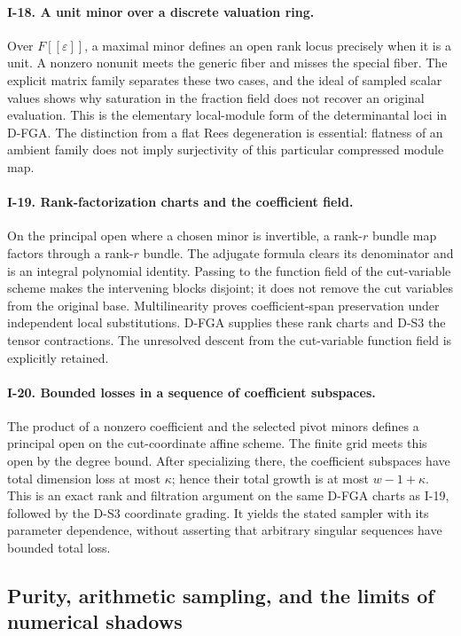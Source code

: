 \paragraph{I-18. A unit minor over a discrete valuation ring.}
Over $F[[\varepsilon]]$, a maximal minor defines an open rank locus precisely when it is a unit. A nonzero nonunit meets the generic fiber and misses the special fiber. The explicit matrix family separates these two cases, and the ideal of sampled scalar values shows why saturation in the fraction field does not recover an original evaluation. This is the elementary local-module form of the determinantal loci in D-FGA. The distinction from a flat Rees degeneration is essential: flatness of an ambient family does not imply surjectivity of this particular compressed module map.

\paragraph{I-19. Rank-factorization charts and the coefficient field.}
On the principal open where a chosen minor is invertible, a rank-$r$ bundle map factors through a rank-$r$ bundle. The adjugate formula clears its denominator and is an integral polynomial identity. Passing to the function field of the cut-variable scheme makes the intervening blocks disjoint; it does not remove the cut variables from the original base. Multilinearity proves coefficient-span preservation under independent local substitutions. D-FGA supplies these rank charts and D-S3 the tensor contractions. The unresolved descent from the cut-variable function field is explicitly retained.

\paragraph{I-20. Bounded losses in a sequence of coefficient subspaces.}
The product of a nonzero coefficient and the selected pivot minors defines a principal open on the cut-coordinate affine scheme. The finite grid meets this open by the degree bound. After specializing there, the coefficient subspaces have total dimension loss at most $\kappa$; hence their total growth is at most $w-1+\kappa$. This is an exact rank and filtration argument on the same D-FGA charts as I-19, followed by the D-S3 coordinate grading. It yields the stated sampler with its parameter dependence, without asserting that arbitrary singular sequences have bounded total loss.

\subsection{Purity, arithmetic sampling, and the limits of numerical shadows}

